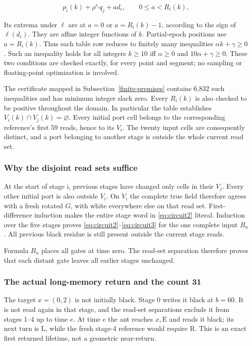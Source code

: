 \documentclass[
  11pt,
]{article}
\begin{document}
\[
p_i(k)+\rho^{r_i}q_j+ad_i,\qquad0\le a<R_i(k),
\]

Its extrema under \(\ell\) are at \(a=0\) or \(a=R_i(k)-1\), according to the sign of
$\ell(d_i)$. They are affine integer functions of \(k\). Partial-epoch positions
use \(a=R_i(k)\). Thus each table row reduces to finitely many inequalities
$\alpha k+\gamma\ge0$. Such an inequality holds for all integers
$k\ge10$ iff $\alpha\ge0$ and
$10\alpha+\gamma\ge0$. These two conditions are checked exactly,
for every point and segment; no sampling or floating-point optimization
is involved.

The certificate mapped in Subsection~\ref{finite-premises} contains 6,832 such inequalities and has
minimum integer slack zero. Every $R_i(k)$ is also checked to be positive
throughout the domain. In particular the table establishes $V_i(k)\cap V_j(k)=\varnothing$. Every initial port cell belongs to the
corresponding reference's first 59 reads, hence to its $V_i$. The twenty
input cells are consequently distinct, and a port belonging to another
stage is outside the whole current read set.

\subsubsection{Why the disjoint read sets
suffice}\label{why-the-disjoint-read-sets-suffice}

At the start of stage i, previous stages have changed only cells in
their $V_j$. Every other initial port is also outside $V_i$. On $V_i$ the
complete true field therefore agrees with a fresh rotated \(G\), with white
everywhere else on that read set. First-difference induction makes the
entire stage word in \eqref{eq:circuit2} literal. Induction over the five stages
proves \eqref{eq:circuit2}--\eqref{eq:circuit3} for the one complete input $B_n$. All
previous black residue is still present outside the current stage reads.

Formula $B_n$ places all gates at time zero. The read-set separation
therefore proves that each distant gate leaves all earlier stages unchanged.

\subsubsection{The actual long-memory return and the count
31}\label{the-actual-long-memory-return-and-the-count-31}

The target \(x=(0,2)\) is not initially black. Stage 0 writes it black at
\(b=60\). It is not read again in that stage, and the read-set separations
exclude it from stages 1--4 up to time \(e\). At time \(e\) the ant reaches
\(x,\mathrm E\) and reads it black; its next turn is \(\mathrm L\), while
the fresh stage-4 reference would require \(\mathrm R\). This is an exact first returned lifetime, not
a geometric near-return.
\end{document}
